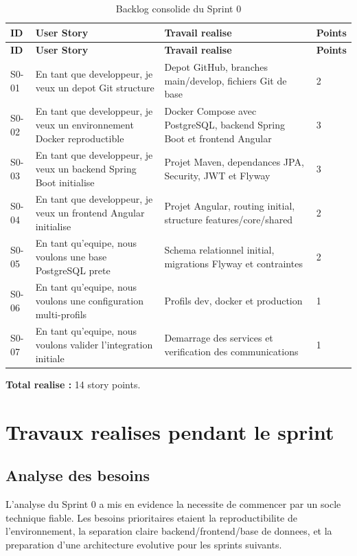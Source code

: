 \documentclass[12pt,a4paper]{report}
\begin{document}
\begin{longtable}{|p{1.6cm}|p{5.3cm}|p{5.4cm}|p{1.4cm}|}
\caption{Backlog consolide du Sprint 0}\\
\hline
\textbf{ID} & \textbf{User Story} & \textbf{Travail realise} & \textbf{Points} \\
\hline
\endfirsthead
\hline
\textbf{ID} & \textbf{User Story} & \textbf{Travail realise} & \textbf{Points} \\
\hline
\endhead
S0-01 & En tant que developpeur, je veux un depot Git structure & Depot GitHub, branches main/develop, fichiers Git de base & 2 \\
\hline
S0-02 & En tant que developpeur, je veux un environnement Docker reproductible & Docker Compose avec PostgreSQL, backend Spring Boot et frontend Angular & 3 \\
\hline
S0-03 & En tant que developpeur, je veux un backend Spring Boot initialise & Projet Maven, dependances JPA, Security, JWT et Flyway & 3 \\
\hline
S0-04 & En tant que developpeur, je veux un frontend Angular initialise & Projet Angular, routing initial, structure features/core/shared & 2 \\
\hline
S0-05 & En tant qu'equipe, nous voulons une base PostgreSQL prete & Schema relationnel initial, migrations Flyway et contraintes & 2 \\
\hline
S0-06 & En tant qu'equipe, nous voulons une configuration multi-profils & Profils dev, docker et production & 1 \\
\hline
S0-07 & En tant qu'equipe, nous voulons valider l'integration initiale & Demarrage des services et verification des communications & 1 \\
\hline
\end{longtable}

\textbf{Total realise :} 14 story points.

\section{Travaux realises pendant le sprint}

\subsection{Analyse des besoins}

L'analyse du Sprint 0 a mis en evidence la necessite de commencer par un socle technique fiable. Les besoins prioritaires etaient la reproductibilite de l'environnement, la separation claire backend/frontend/base de donnees, et la preparation d'une architecture evolutive pour les sprints suivants.
\end{document}
